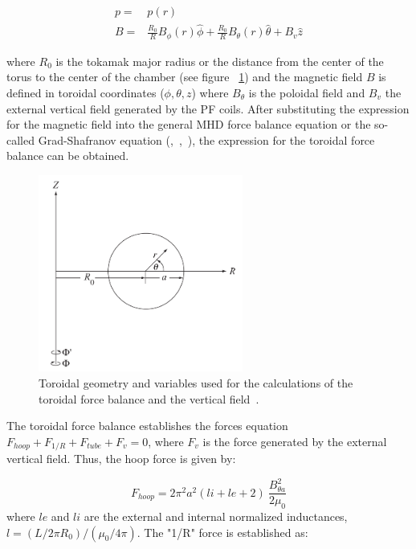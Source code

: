 	\begin{equation}
	\begin{aligned}
	p=&p(r)\\
	B =& \frac{R_0}{R}B_{\phi}(r) \hat{\phi} + \frac{R_0}{R}B_{\theta}(r)\hat{\theta}+B_v \hat{z}
	\end{aligned}
	\end{equation}
	
where $R_0$ is the tokamak major radius or the distance from the center of the torus to the center of the chamber (see figure ~\ref{tor_geo}) and the magnetic field $B$ is defined in toroidal coordinates ($\phi,\theta,z$) where $B_{\theta}$ is the poloidal field and $B_v$ the external vertical field generated by the PF coils. After substituting the expression for the magnetic field into the general MHD force balance equation or the so-called Grad-Shafranov equation (\cite[Chapter~6]{Miyamoto2011},~\cite[Chapter~11]{Freidberg2007},~\cite[Chpater~2]{Zohm2015}), the expression for the toroidal force balance can be obtained.
\smallskip

\begin{figure}
	\centering
	\includegraphics[width=0.6\textwidth]{Chp1/toroidal_geo.png}
	\caption{  Toroidal geometry and variables used for the calculations of the toroidal force balance and the vertical field~\cite[Chapter~11]{Freidberg2007}.\label{tor_geo}}
\end{figure}


The toroidal force balance establishes the forces equation $F_{hoop}+ F_{1/R} + F_{tube}+ F_{v} =0$, where $F_v$ is the force generated by the external vertical field. Thus, the hoop force is given by:

\begin{equation}
F_{hoop}=2\pi^2a^2(li+le+2)~\frac{B_{\theta a}^2}{2\mu_0}
\end{equation}
 where $le$ and $li$ are the external and internal normalized inductances, $l= (L/2\pi R_0)/(\mu_0/4\pi)$. The "1/R" force is established as:
 
